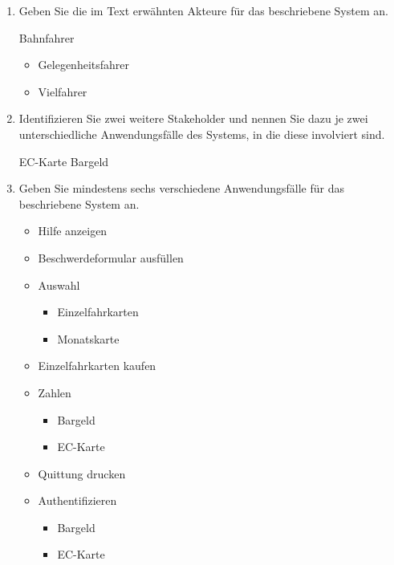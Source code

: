 \documentclass{bschlangaul-aufgabe}
\begin{document}
\begin{enumerate}


\item Geben Sie die im Text erwähnten Akteure für das beschriebene
System an.

\begin{bAntwort}
Bahnfahrer

\begin{itemize}
\item Gelegenheitsfahrer

\item Vielfahrer
\end{itemize}
\end{bAntwort}


\item Identifizieren Sie zwei weitere Stakeholder und nennen Sie dazu je
zwei unterschiedliche Anwendungsfälle des Systems, in die diese
involviert sind.

\begin{bAntwort}
EC-Karte
Bargeld
\end{bAntwort}


\item Geben Sie mindestens sechs verschiedene Anwendungsfälle für das
beschriebene System an.

\begin{bAntwort}
\begin{itemize}
\item Hilfe anzeigen
\item Beschwerdeformular ausfüllen
\item Auswahl
\begin{itemize}
\item Einzelfahrkarten
\item Monatskarte
\end{itemize}
\item Einzelfahrkarten kaufen
\item Zahlen
\begin{itemize}
\item Bargeld
\item EC-Karte
\end{itemize}
\item Quittung drucken
\item Authentifizieren

\begin{itemize}
\item Bargeld
\item EC-Karte
\end{itemize}
\end{itemize}
\end{bAntwort}


\end{enumerate}
\end{document}
